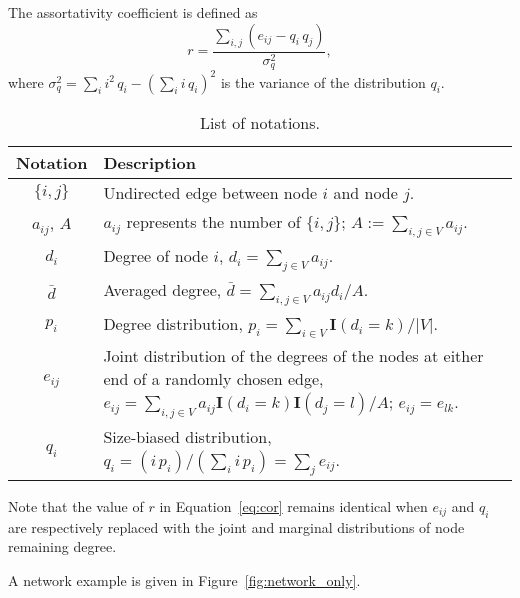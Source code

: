 \documentclass[12pt, letterpaper, titlepage]{article}
\newcommand{\mathbm}{\mathbf}
\newcommand{\indicator}{\mathbm{I}}
\begin{document}
The assortativity coefficient is defined as 
\begin{equation}
	\label{eq:cor}
	r = \frac{\sum_{i,j} (e_{ij} - q_i\, q_j)}{\sigma_q^2},
\end{equation}
where $\sigma_q^2 = \sum_{i} i^2\, q_i - \left(\sum_i i\, q_i\right)^2$
is the variance of the distribution $q_i$.

\begin{table}[tbp]
	\centering
	\caption{List of notations.}
	\label{table:notations}
	\begin{tabularx}{\textwidth}{c X}
		\toprule
		Notation & Description\\
		\midrule
		$\{i, j\}$ & Undirected edge between node 
		$i$ and node $j$.\\
		$a_{ij}$, $A$ & 
		$a_{ij}$ represents the number of $\{i, j\}$;
		$A:= \sum_{i, j \in V} a_{ij}$.\\
		$d_i$ & Degree of node $i$, 
		$d_i = \sum_{j \in V} a_{ij}$.\\
		$\bar{d}$ & Averaged degree,
		$\bar{d} = \sum_{i, j \in V} a_{ij} d_i / A$.\\
		$p_i$ & Degree distribution, 
		$p_i = \sum_{i \in V} \indicator (d_i = k) / |V|$.\\
		$e_{ij}$ & Joint distribution of the degrees of 
		the nodes at either end of a randomly chosen edge,
		$e_{ij} = \sum_{i, j \in V} a_{ij} \indicator (d_i = k) 
		\indicator(d_j = l) / A$; $e_{ij} = e_{lk}$.\\
		$q_i$ & Size-biased distribution, 
		$q_i = \left(i \, p_i\right) / \left(\sum_i i \, p_i\right) = 
		\sum_{j} e_{ij}$.\\
    \bottomrule
	\end{tabularx}
\end{table}


Note that the value of $r$ in Equation~\ref{eq:cor} remains 
identical when $e_{ij}$ and $q_i$ are respectively 
replaced with the joint and marginal distributions of 
node remaining degree.


A network example is given in Figure~\ref{fig:network_only}.
\end{document}
